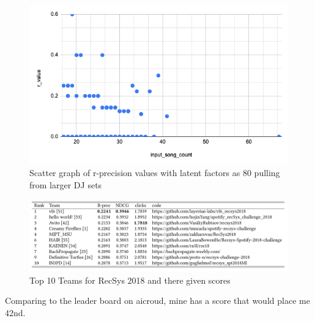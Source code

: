 \begin{figure}[H]
	\includegraphics[scale=0.6]{images/80_big_sets}
	\centering
	\caption{Scatter graph of r-precision values with latent factors as 80 pulling from larger DJ sets} 
\end{figure}


\begin{figure}[H]
	\includegraphics[scale=0.6]{images/recsys_scores}
	\centering
	\caption{Top 10 Teams for RecSys 2018 and there given scores} 
\end{figure}

Comparing to the leader board on aicroud, mine has a score that would place me 42nd.
